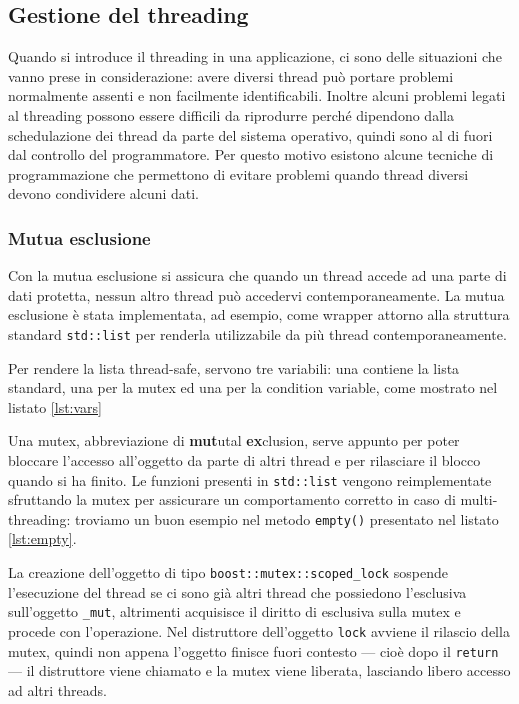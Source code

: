 \subsection{Gestione del threading}
Quando si introduce il threading in una applicazione, ci sono delle situazioni
che vanno prese in considerazione: avere diversi thread pu\`o portare problemi
normalmente assenti e non facilmente identificabili. Inoltre alcuni problemi
legati al threading possono essere difficili da riprodurre perch\'e  dipendono
dalla schedulazione dei thread da parte del sistema operativo, quindi sono al di
fuori dal controllo del programmatore. Per questo motivo esistono alcune
tecniche di programmazione che permettono di evitare problemi quando thread
diversi devono condividere alcuni dati.

\subsubsection{Mutua esclusione}

Con la mutua esclusione si assicura che quando un thread accede ad una parte di
dati protetta, nessun altro thread pu\`o accedervi contemporaneamente. La mutua
esclusione \`e stata implementata, ad esempio, come wrapper attorno alla
struttura standard \texttt{std::list} per renderla utilizzabile da pi\`u thread
contemporaneamente.

Per rendere la lista thread-safe, servono tre variabili: una contiene la lista
standard, una per la mutex ed una per la condition variable, come mostrato nel
listato \ref{lst:vars}

Una mutex, abbreviazione di \textbf{mut}utal \textbf{ex}clusion, serve appunto
per poter bloccare l'accesso all'oggetto da parte di altri thread e per
rilasciare il blocco quando si ha finito. Le funzioni presenti in
\texttt{std::list} vengono reimplementate sfruttando la mutex per assicurare un
comportamento corretto in caso di multi-threading: troviamo un buon esempio nel
metodo \texttt{empty()} presentato nel listato \ref{lst:empty}.


La creazione dell'oggetto di tipo \texttt{boost::mutex::scoped\_lock} sospende
l'esecuzione del thread se ci sono gi\`a altri thread che possiedono l'esclusiva
sull'oggetto \texttt{\_mut}, altrimenti acquisisce il diritto di esclusiva
sulla mutex e procede con l'operazione. Nel distruttore dell'oggetto
\texttt{lock} avviene il rilascio della mutex, quindi non appena l'oggetto
finisce fuori contesto --- cio\`e dopo il \texttt{return} --- il distruttore
viene chiamato e la mutex viene liberata, lasciando libero accesso ad altri
threads.

